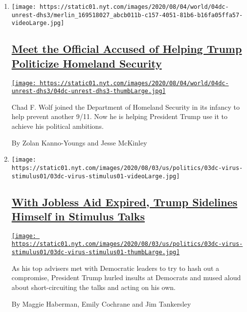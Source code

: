 \begin{enumerate}
\def\labelenumi{\arabic{enumi}.}
\item
  \texttt{[image: https://static01.nyt.com/images/2020/08/04/world/04dc-unrest-dhs3/merlin\_169518027\_abcb011b-c157-4051-81b6-b16fa05ffa57-videoLarge.jpg]}

  \hypertarget{meet-the-official-accused-of-helping-trump-politicize-homeland-security}{%
  \subsection{\texorpdfstring{\href{/2020/08/04/us/politics/trump-homeland-security.html}{Meet
  the Official Accused of Helping Trump Politicize Homeland
  Security}}{Meet the Official Accused of Helping Trump Politicize Homeland Security}}\label{meet-the-official-accused-of-helping-trump-politicize-homeland-security}}

  \href{/2020/08/04/us/politics/trump-homeland-security.html}{\texttt{[image: https://static01.nyt.com/images/2020/08/04/world/04dc-unrest-dhs3/04dc-unrest-dhs3-thumbLarge.jpg]}}

  Chad F. Wolf joined the Department of Homeland Security in its infancy
  to help prevent another 9/11. Now he is helping President Trump use it
  to achieve his political ambitions.

  By Zolan Kanno-Youngs and Jesse McKinley
\item
  \texttt{[image: https://static01.nyt.com/images/2020/08/03/us/politics/03dc-virus-stimulus01/03dc-virus-stimulus01-videoLarge.jpg]}

  \hypertarget{with-jobless-aid-expired-trump-sidelines-himself-in-stimulus-talks}{%
  \subsection{\texorpdfstring{\href{/2020/08/03/us/politics/congress-jobless-aid-talks-trump.html}{With
  Jobless Aid Expired, Trump Sidelines Himself in Stimulus
  Talks}}{With Jobless Aid Expired, Trump Sidelines Himself in Stimulus Talks}}\label{with-jobless-aid-expired-trump-sidelines-himself-in-stimulus-talks}}

  \href{/2020/08/03/us/politics/congress-jobless-aid-talks-trump.html}{\texttt{[image: https://static01.nyt.com/images/2020/08/03/us/politics/03dc-virus-stimulus01/03dc-virus-stimulus01-thumbLarge.jpg]}}

  As his top advisers met with Democratic leaders to try to hash out a
  compromise, President Trump hurled insults at Democrats and mused
  aloud about short-circuiting the talks and acting on his own.

  By Maggie Haberman, Emily Cochrane and Jim Tankersley
\end{enumerate}

